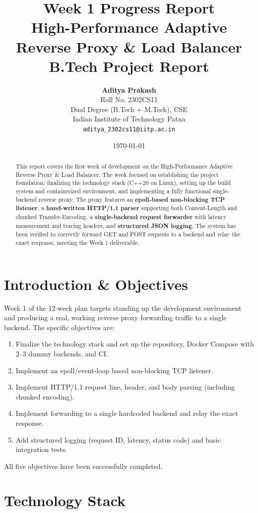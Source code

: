 \documentclass[11pt, a4paper]{article}
\title{\vspace{-2em}\textbf{Week 1 Progress Report} \\ \Large High-Performance Adaptive Reverse Proxy \& Load Balancer \\ \vspace{0.5em} \large B.Tech Project Report}
\author{\textbf{Aditya Prakash} \\ Roll No. 2302CS11 \\ Dual Degree (B.Tech + M.Tech), CSE \\ Indian Institute of Technology Patna \\ \texttt{aditya\_2302cs11@iitp.ac.in}}
\date{\today}
\begin{document}
\maketitle

\begin{abstract}
This report covers the first week of development on the High-Performance Adaptive Reverse Proxy \& Load Balancer. The week focused on establishing the project foundation: finalizing the technology stack (C++20 on Linux), setting up the build system and containerized environment, and implementing a fully functional single-backend reverse proxy. The proxy features an \textbf{epoll-based non-blocking TCP listener}, a \textbf{hand-written HTTP/1.1 parser} supporting both Content-Length and chunked Transfer-Encoding, a \textbf{single-backend request forwarder} with latency measurement and tracing headers, and \textbf{structured JSON logging}. The system has been verified to correctly forward GET and POST requests to a backend and relay the exact response, meeting the Week 1 deliverable.
\end{abstract}

\section{Introduction \& Objectives}

Week 1 of the 12-week plan targets standing up the development environment and producing a real, working reverse proxy forwarding traffic to a single backend. The specific objectives are:

\begin{enumerate}
    \item Finalize the technology stack and set up the repository, Docker Compose with 2--3 dummy backends, and CI.
    \item Implement an epoll/event-loop based non-blocking TCP listener.
    \item Implement HTTP/1.1 request line, header, and body parsing (including chunked encoding).
    \item Implement forwarding to a single hardcoded backend and relay the exact response.
    \item Add structured logging (request ID, latency, status code) and basic integration tests.
\end{enumerate}

All five objectives have been successfully completed.

\section{Technology Stack}
\end{document}
